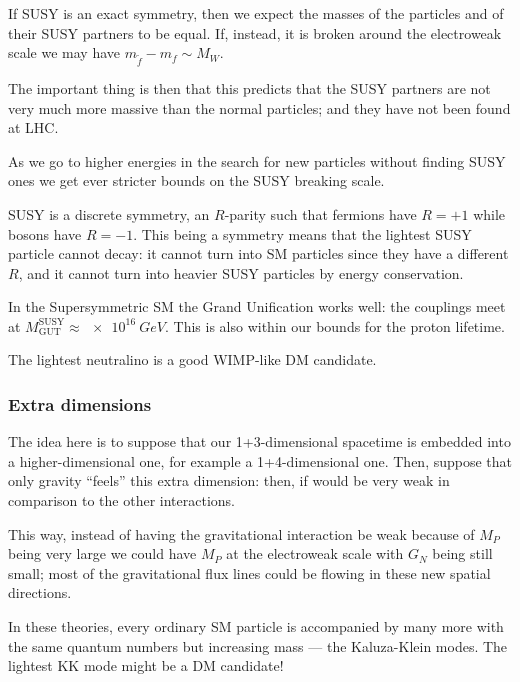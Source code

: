 \documentclass[main.tex]{subfiles}
\begin{document}
If SUSY is an exact symmetry, then we expect the masses of the particles and of their SUSY partners to be equal. 
If, instead, it is broken around the electroweak scale we may have \(m_{\widetilde{f}}  - m_f \sim M_W\).

The important thing is then that this predicts that the SUSY partners are not very much more massive than the normal particles; and they have not been found at LHC. 

As we go to higher energies in the search for new particles without finding SUSY ones we get ever stricter bounds on the SUSY breaking scale.

SUSY is a discrete symmetry, an \(R\)-parity such that fermions have \(R = +1\) while bosons have \(R = -1\). 
This being a symmetry means that the lightest SUSY particle cannot decay: it cannot turn into SM particles since they have a different \(R\), and it cannot turn into heavier SUSY particles by energy conservation. 

In the Supersymmetric SM the Grand Unification works well: the couplings meet at \(M _{\text{GUT}}^{\text{SUSY}} \approx \SI{e16}{GeV}\). 
This is also within our bounds for the proton lifetime.

The lightest neutralino is a good WIMP-like DM candidate. 

\subsubsection{Extra dimensions}

The idea here is to suppose that our 1+3-dimensional spacetime is embedded into a higher-dimensional one, for example a 1+4-dimensional one. 
Then, suppose that only gravity ``feels'' this extra dimension: then, if would be very weak in comparison to the other interactions. 


This way, instead of having the gravitational interaction be weak because of \(M_P\) being very large we could have \(M_P\) at the electroweak scale with \(G_N\) being still small; most of the gravitational flux lines could be flowing in these new spatial directions.  

In these theories, every ordinary SM particle is accompanied by many more with the same quantum numbers but increasing mass --- the Kaluza-Klein modes.
The lightest KK mode might be a DM candidate!
\end{document}
